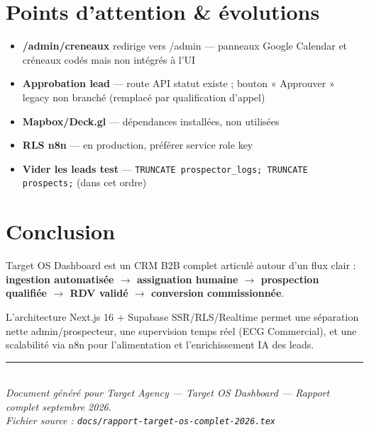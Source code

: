 \documentclass[11pt,a4paper]{report}
\begin{document}
\chapter{Points d'attention \& évolutions}

\begin{itemize}
  \item \textbf{/admin/creneaux} redirige vers /admin --- panneaux Google Calendar et créneaux codés mais non intégrés à l'UI
  \item \textbf{Approbation lead} --- route API statut existe ; bouton « Approuver » legacy non branché (remplacé par qualification d'appel)
  \item \textbf{Mapbox/Deck.gl} --- dépendances installées, non utilisées
  \item \textbf{RLS n8n} --- en production, préférer service role key
  \item \textbf{Vider les leads test} --- \texttt{TRUNCATE prospector\_logs; TRUNCATE prospects;} (dans cet ordre)
\end{itemize}

\chapter{Conclusion}

Target OS Dashboard est un CRM B2B complet articulé autour d'un flux clair :
\textbf{ingestion automatisée $\rightarrow$ assignation humaine $\rightarrow$ prospection qualifiée $\rightarrow$ RDV validé $\rightarrow$ conversion commissionnée}.

L'architecture Next.js 16 + Supabase SSR/RLS/Realtime permet une séparation nette admin/prospecteur, une supervision temps réel (ECG Commercial), et une scalabilité via n8n pour l'alimentation et l'enrichissement IA des leads.

\vspace{1cm}
\noindent\rule{\textwidth}{0.4pt}\\
\small\textit{Document généré pour Target Agency --- Target OS Dashboard --- Rapport complet septembre 2026.\\
Fichier source : \texttt{docs/rapport-target-os-complet-2026.tex}}
\end{document}
